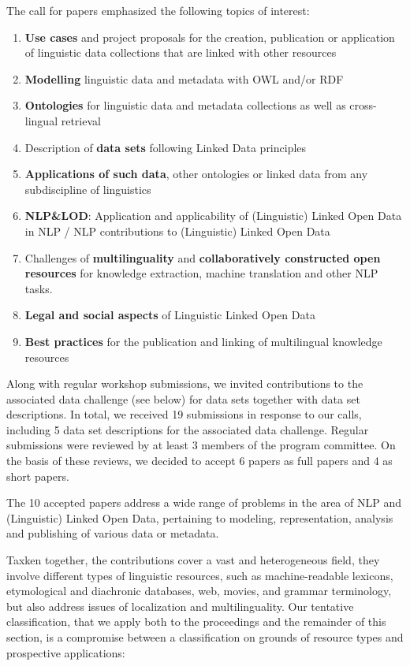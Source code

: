 The call for papers emphasized the following topics of interest:

\begin{enumerate}
\item \textbf{Use cases} and project proposals for the creation, publication or application of linguistic data collections that are linked with other resources
\item \textbf{Modelling} linguistic data and metadata with OWL and/or RDF
\item \textbf{Ontologies} for linguistic data and metadata collections as well as cross-lingual retrieval
\item Description of \textbf{data sets} following Linked Data principles
\item \textbf{Applications of such data}, other ontologies or linked data from any subdiscipline of linguistics %
\item \textbf{NLP\&LOD}: Application and applicability of (Linguistic) Linked Open Data in NLP / NLP contributions to (Linguistic) Linked Open Data
\item Challenges of \textbf{multilinguality} and \textbf{collaboratively constructed open resources} %
for knowledge extraction, machine translation and other NLP tasks.
\item \textbf{Legal and social aspects} of Linguistic Linked Open Data
\item \textbf{Best practices} for the publication and linking of multilingual knowledge resources
\end{enumerate}

\noindent 
Along with regular workshop submissions, we invited contributions to the associated data challenge (see below) for data sets together with data set descriptions.
In total, we received 19 submissions in response to our calls, including 5 data set descriptions for the associated data challenge. Regular submissions were reviewed by at least 3 
members of the program committee. 
On the basis of these reviews, we decided to accept 6 papers as full papers and 4 as short papers.

The 10 accepted papers address a wide range of problems in the area of NLP and (Linguistic) Linked Open Data, pertaining to modeling, representation, analysis and publishing of various 
data or metadata.

Taxken together, the contributions cover a vast and heterogeneous field, they involve different types of linguistic resources, such as machine-readable lexicons, etymological and diachronic databases, web, movies, and grammar terminology, but also address issues of localization and multilinguality. Our tentative classification, that we apply both to the proceedings and the remainder of this section, is a compromise between a classification on grounds of resource types and prospective applications:

